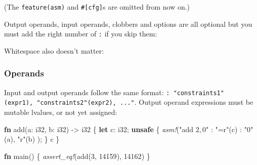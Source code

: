 \documentclass[a4paper,]{book}
\newenvironment{Shaded}{\begin{snugshade}}{\end{snugshade}}
\newcommand{\KeywordTok}[1]{\textcolor[rgb]{0.13,0.29,0.53}{\textbf{{#1}}}}
\newcommand{\DataTypeTok}[1]{\textcolor[rgb]{0.13,0.29,0.53}{{#1}}}
\newcommand{\DecValTok}[1]{\textcolor[rgb]{0.00,0.00,0.81}{{#1}}}
\newcommand{\StringTok}[1]{\textcolor[rgb]{0.31,0.60,0.02}{{#1}}}
\newcommand{\PreprocessorTok}[1]{\textcolor[rgb]{0.56,0.35,0.01}{\textit{{#1}}}}
\newcommand{\NormalTok}[1]{{#1}}
\begin{document}
(The \texttt{feature(asm)} and \texttt{\#{[}cfg{]}}s are omitted from
now on.)

Output operands, input operands, clobbers and options are all optional
but you must add the right number of \texttt{:} if you skip them:

\begin{Shaded}
\end{Shaded}

Whitespace also doesn't matter:

\begin{Shaded}
\end{Shaded}

\subsubsection{Operands}\label{operands}

Input and output operands follow the same format:
\texttt{:\ "constraints1"(expr1),\ "constraints2"(expr2),\ ..."}. Output
operand expressions must be mutable lvalues, or not yet assigned:

\begin{Shaded}
\begin{Highlighting}[]
\KeywordTok{fn} \NormalTok{add(a: }\DataTypeTok{i32}\NormalTok{, b: }\DataTypeTok{i32}\NormalTok{) -> }\DataTypeTok{i32} \NormalTok{\{}
    \KeywordTok{let} \NormalTok{c: }\DataTypeTok{i32}\NormalTok{;}
    \KeywordTok{unsafe} \NormalTok{\{}
        \PreprocessorTok{asm!}\NormalTok{(}\StringTok{"add $2, $0"}
             \NormalTok{: }\StringTok{"=r"}\NormalTok{(c)}
             \NormalTok{: }\StringTok{"0"}\NormalTok{(a), }\StringTok{"r"}\NormalTok{(b)}
             \NormalTok{);}
    \NormalTok{\}}
    \NormalTok{c}
\NormalTok{\}}

\KeywordTok{fn} \NormalTok{main() \{}
    \PreprocessorTok{assert_eq!}\NormalTok{(add(}\DecValTok{3}\NormalTok{, }\DecValTok{14159}\NormalTok{), }\DecValTok{14162}\NormalTok{)}
\NormalTok{\}}
\end{Highlighting}
\end{Shaded}
\end{document}
